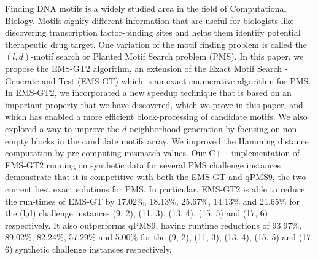 
\begin{thesisabstract}

Finding DNA motifs is a widely studied area in the field of Computational Biology. Motifs signify different information that are useful for biologists like discovering transcription factor-binding sites and helps them identify potential therapeutic drug target. One variation of the motif finding problem is called the $(l, d)$-motif search or Planted Motif Search problem (PMS). In this paper, we propose the EMS-GT2 algorithm, an extension of the Exact Motif Search - Generate and Test (EMS-GT) which is an exact enumerative algorithm for PMS. In EMS-GT2, we incorporated a new speedup technique that is based on an important property that we have discovered, which we prove in this paper, and which has enabled a more efficient block-processing of candidate motifs. We also explored a way to improve the $d$-neighborhood generation by focusing on non empty blocks in the candidate motifs array. We improved the Hamming distance computation by pre-computing mismatch values. Our C++ implementation of EMS-GT2 running on synthetic data for several PMS challenge instances demonstrate that it is competitive with both the EMS-GT and qPMS9, the two current best exact solutions for PMS. In particular, EMS-GT2 is able to reduce the run-times of EMS-GT by 17.02\%, 18.13\%, 25.67\%, 14.13\% and 21.65\% for the (l,d) challenge instances (9, 2), (11, 3), (13, 4), (15, 5) and (17, 6) respectively. It also outperforms qPMS9, having runtime reductions of 93.97\%, 89.02\%, 82.24\%, 57.29\% and 5.00\% for the (9, 2), (11, 3), (13, 4), (15, 5) and (17, 6) synthetic challenge instances respectively.

\end{thesisabstract}
